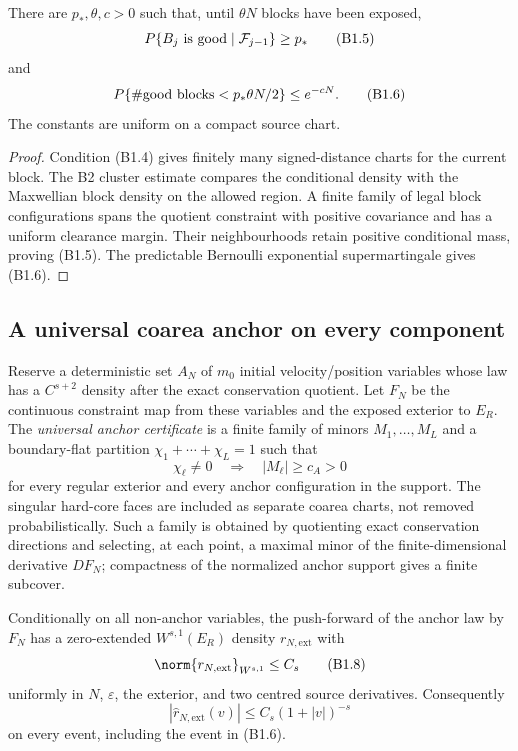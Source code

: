 \begin{lemma}
\label{lem:r29-b1-good}
There are $p_*,\theta,c>0$ such that, until $\theta N$ blocks have been
exposed,
\[
 P\{B_j\hbox{ is good}\mid\mathcal F_{j-1}\}\ge p_*      \tag{B1.5}
\]
and
\[
 P\{\#\hbox{good blocks}<p_*\theta N/2\}\le e^{-cN}.      \tag{B1.6}
\]
The constants are uniform on a compact source chart.
\end{lemma}

\begin{proof}
Condition (B1.4) gives finitely many signed-distance charts for the current
block.  The B2 cluster estimate compares the conditional density with the
Maxwellian block density on the allowed region.  A finite family of legal
block configurations spans the quotient constraint with positive covariance
and has a uniform clearance margin.  Their neighbourhoods retain positive
conditional mass, proving (B1.5).  The predictable Bernoulli exponential
supermartingale gives (B1.6).
\end{proof}

\subsection{A universal coarea anchor on every component}

Reserve a deterministic set $A_N$ of $m_0$ initial velocity/position variables
whose law has a $C^{s+2}$ density after the exact conservation quotient.  Let
$F_N$ be the continuous constraint map from these variables and the exposed
exterior to $E_R$.  The \emph{universal anchor certificate} is a finite family
of minors $M_1,\ldots,M_L$ and a boundary-flat partition
$\chi_1+\cdots+\chi_L=1$ such that
\[
 \chi_\ell\ne0\quad\Longrightarrow\quad |M_\ell|\ge c_A>0              \tag{B1.7}
\]
for every regular exterior and every anchor configuration in the support.
The singular hard-core faces are included as separate coarea charts, not
removed probabilistically.  Such a family is obtained by quotienting exact
conservation directions and selecting, at each point, a maximal minor of the
finite-dimensional derivative $DF_N$; compactness of the normalized anchor
support gives a finite subcover.

\begin{lemma}
\label{lem:r29-b1-anchor}
Conditionally on all non-anchor variables, the push-forward of the anchor law
by $F_N$ has a zero-extended $W^{s,1}(E_R)$ density $r_{N,\mathrm{ext}}$ with
\[
 \norm{r_{N,\mathrm{ext}}}_{W^{s,1}}
 \le C_s                                                   \tag{B1.8}
\]
uniformly in $N$, $\varepsilon$, the exterior, and two centred source
derivatives.  Consequently
\[
 |\widehat r_{N,\mathrm{ext}}(v)|
 \le C_s(1+|v|)^{-s}                                      \tag{B1.9}
\]
on every event, including the event in (B1.6).
\end{lemma}

